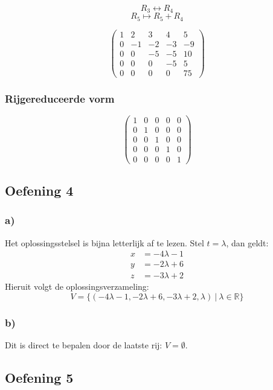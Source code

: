 \documentclass[lineaire_algebra_oplossingen.tex]{subfiles}
\begin{document}
\[R_3 \leftrightarrow R_4\]
\[ R_5 \longmapsto R_5 + R_4\]

\[
\begin{pmatrix}
1 &  2 &  3 &  4 &  5\\
0 & -1 & -2 & -3 & -9\\
0 &  0 & -5 & -5 & 10\\
0 &  0 &  0 & -5 &  5\\
0 &  0 &  0 &  0 & 75 
\end{pmatrix}
\]
\subsubsection*{Rijgereduceerde vorm}
\[
\begin{pmatrix}
1 &  0 &  0 &  0 & 0\\
0 &  1 &  0 &  0 & 0\\
0 &  0 &  1 &  0 & 0\\
0 &  0 &  0 &  1 & 0\\
0 &  0 &  0 &  0 & 1 
\end{pmatrix}
\]

\subsection{Oefening 4}
\subsubsection*{a)}
Het oplossingsstelsel is bijna letterlijk af te lezen. Stel $t=\lambda$, dan geldt:
\begin{align*}
x &= -4\lambda - 1\\
y &= -2\lambda + 6\\
z &= -3\lambda + 2
\end{align*}
Hieruit volgt de oplossingsverzameling:
\[
V=\{(-4\lambda - 1,-2\lambda + 6,-3\lambda + 2, \lambda)\ |\ \lambda \in \mathbb{R}\}
\]
\subsubsection*{b)}
Dit is direct te bepalen door de laatste rij: $V=\emptyset$.
\subsection{Oefening 5}
\end{document}
